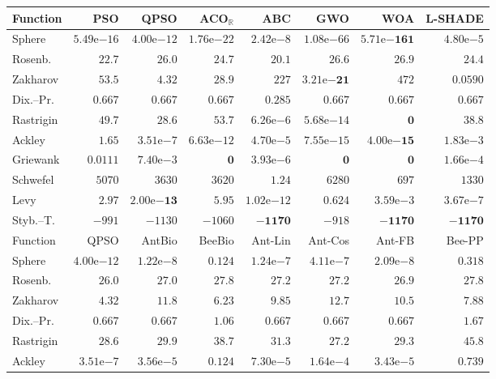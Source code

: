 \begin{tabular}{lrrrrrrr}
\toprule
Function & PSO & QPSO & ACO$_\mathbb{R}$ & ABC & GWO & WOA & L-SHADE \\
\midrule
Sphere & $5.49\mathrm{e}{-16}$ & $4.00\mathrm{e}{-12}$ & $1.76\mathrm{e}{-22}$ & $2.42\mathrm{e}{-8}$ & $1.08\mathrm{e}{-66}$ & $\mathbf{5.71\mathrm{e}{-161}}$ & $4.80\mathrm{e}{-5}$ \\
Rosenb. & $22.7$ & $26.0$ & $24.7$ & $\mathbf{20.1}$ & $26.6$ & $26.9$ & $24.4$ \\
Zakharov & $53.5$ & $4.32$ & $28.9$ & $227$ & $\mathbf{3.21\mathrm{e}{-21}}$ & $472$ & $0.0590$ \\
Dix.--Pr. & $0.667$ & $0.667$ & $0.667$ & $\mathbf{0.285}$ & $0.667$ & $0.667$ & $0.667$ \\
Rastrigin & $49.7$ & $28.6$ & $53.7$ & $6.26\mathrm{e}{-6}$ & $5.68\mathrm{e}{-14}$ & $\mathbf{0}$ & $38.8$ \\
Ackley & $1.65$ & $3.51\mathrm{e}{-7}$ & $6.63\mathrm{e}{-12}$ & $4.70\mathrm{e}{-5}$ & $7.55\mathrm{e}{-15}$ & $\mathbf{4.00\mathrm{e}{-15}}$ & $1.83\mathrm{e}{-3}$ \\
Griewank & $0.0111$ & $7.40\mathrm{e}{-3}$ & $\mathbf{0}$ & $3.93\mathrm{e}{-6}$ & $\mathbf{0}$ & $\mathbf{0}$ & $1.66\mathrm{e}{-4}$ \\
Schwefel & $5070$ & $3630$ & $3620$ & $\mathbf{1.24}$ & $6280$ & $697$ & $1330$ \\
Levy & $2.97$ & $\mathbf{2.00\mathrm{e}{-13}}$ & $5.95$ & $1.02\mathrm{e}{-12}$ & $0.624$ & $3.59\mathrm{e}{-3}$ & $3.67\mathrm{e}{-7}$ \\
Styb.--T. & $-991$ & $-1130$ & $-1060$ & $-\mathbf{1170}$ & $-918$ & $-\mathbf{1170}$ & $-\mathbf{1170}$ \\
\midrule
Function & QPSO & AntBio & BeeBio & Ant-Lin & Ant-Cos & Ant-FB & Bee-PP \\
\midrule
Sphere & $4.00\mathrm{e}{-12}$ & $1.22\mathrm{e}{-8}$ & $0.124$ & $1.24\mathrm{e}{-7}$ & $4.11\mathrm{e}{-7}$ & $2.09\mathrm{e}{-8}$ & $0.318$ \\
Rosenb. & $26.0$ & $27.0$ & $27.8$ & $27.2$ & $27.2$ & $26.9$ & $27.8$ \\
Zakharov & $4.32$ & $11.8$ & $6.23$ & $9.85$ & $12.7$ & $10.5$ & $7.88$ \\
Dix.--Pr. & $0.667$ & $0.667$ & $1.06$ & $0.667$ & $0.667$ & $0.667$ & $1.67$ \\
Rastrigin & $28.6$ & $29.9$ & $38.7$ & $31.3$ & $27.2$ & $29.3$ & $45.8$ \\
Ackley & $3.51\mathrm{e}{-7}$ & $3.56\mathrm{e}{-5}$ & $0.124$ & $7.30\mathrm{e}{-5}$ & $1.64\mathrm{e}{-4}$ & $3.43\mathrm{e}{-5}$ & $0.739$ \\

\end{tabular}
